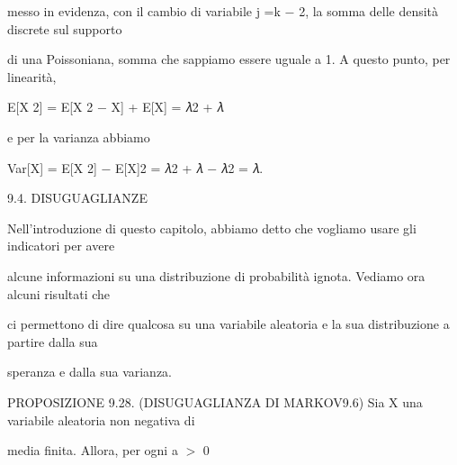 \documentclass[a4paper,portrait,12pt]{article}
\begin{document}
\begin{flushleft}
messo in evidenza, con il cambio di variabile j =k $-$ 2, la somma delle densit\`{a} discrete sul supporto
\end{flushleft}


\begin{flushleft}
di una Poissoniana, somma che sappiamo essere uguale a 1. A questo punto, per linearit\`{a},
\end{flushleft}


\begin{flushleft}
E[X 2] = E[X 2 $-$ X] + E[X] = 𝜆2 + 𝜆
\end{flushleft}


\begin{flushleft}
e per la varianza abbiamo
\end{flushleft}


\begin{flushleft}
Var[X] = E[X 2] $-$ E[X]2 = 𝜆2 + 𝜆 $-$ 𝜆2 = 𝜆.
\end{flushleft}





\begin{flushleft}
9.4. DISUGUAGLIANZE
\end{flushleft}


\begin{flushleft}
Nell'introduzione di questo capitolo, abbiamo detto che vogliamo usare gli indicatori per avere
\end{flushleft}


\begin{flushleft}
alcune informazioni su una distribuzione di probabilit\`{a} ignota. Vediamo ora alcuni risultati che
\end{flushleft}


\begin{flushleft}
ci permettono di dire qualcosa su una variabile aleatoria e la sua distribuzione a partire dalla sua
\end{flushleft}


\begin{flushleft}
speranza e dalla sua varianza.
\end{flushleft}


\begin{flushleft}
PROPOSIZIONE 9.28. (DISUGUAGLIANZA DI MARKOV9.6) Sia X una variabile aleatoria non negativa di
\end{flushleft}


\begin{flushleft}
media finita. Allora, per ogni a $>$ 0
\end{flushleft}
\end{document}
